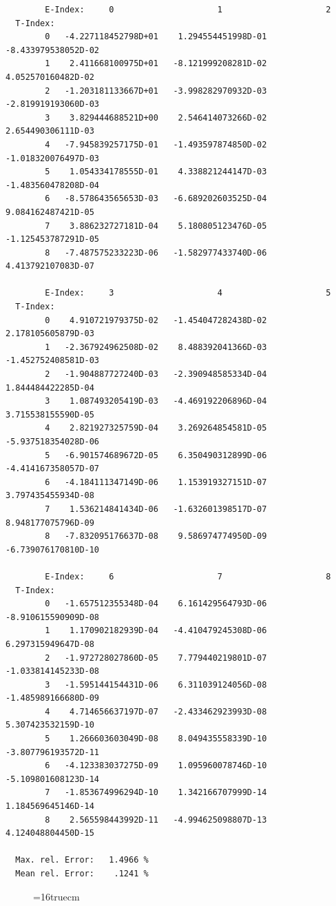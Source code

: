 \documentclass[12pt,dvips]{article}
\begin{document}
\begin{small}\begin{verbatim}
        E-Index:     0                     1                     2
  T-Index:
        0   -4.227118452798D+01    1.294554451998D-01   -8.433979538052D-02
        1    2.411668100975D+01   -8.121999208281D-02    4.052570160482D-02
        2   -1.203181133667D+01   -3.998282970932D-03   -2.819919193060D-03
        3    3.829444688521D+00    2.546414073266D-02    2.654490306111D-03
        4   -7.945839257175D-01   -1.493597874850D-02   -1.018320076497D-03
        5    1.054334178555D-01    4.338821244147D-03   -1.483560478208D-04
        6   -8.578643565653D-03   -6.689202603525D-04    9.084162487421D-05
        7    3.886232727181D-04    5.180805123476D-05   -1.125453787291D-05
        8   -7.487575233223D-06   -1.582977433740D-06    4.413792107083D-07

        E-Index:     3                     4                     5
  T-Index:
        0    4.910721979375D-02   -1.454047282438D-02    2.178105605879D-03
        1   -2.367924962508D-02    8.488392041366D-03   -1.452752408581D-03
        2   -1.904887727240D-03   -2.390948585334D-04    1.844484422285D-04
        3    1.087493205419D-03   -4.469192206896D-04    3.715538155590D-05
        4    2.821927325759D-04    3.269264854581D-05   -5.937518354028D-06
        5   -6.901574689672D-05    6.350490312899D-06   -4.414167358057D-07
        6   -4.184111347149D-06    1.153919327151D-07    3.797435455934D-08
        7    1.536214841434D-06   -1.632601398517D-07    8.948177075796D-09
        8   -7.832095176637D-08    9.586974774950D-09   -6.739076170810D-10

        E-Index:     6                     7                     8
  T-Index:
        0   -1.657512355348D-04    6.161429564793D-06   -8.910615590909D-08
        1    1.170902182939D-04   -4.410479245308D-06    6.297315949647D-08
        2   -1.972728027860D-05    7.779440219801D-07   -1.033814145233D-08
        3   -1.595144154431D-06    6.311039124056D-08   -1.485989166680D-09
        4    4.714656637197D-07   -2.433462923993D-08    5.307423532159D-10
        5    1.266603603049D-08    8.049435558339D-10   -3.807796193572D-11
        6   -4.123383037275D-09    1.095960078746D-10   -5.109801608123D-14
        7   -1.853674996294D-10    1.342166707999D-14    1.184569645146D-14
        8    2.565598443992D-11   -4.994625098807D-13    4.124048804450D-15

  Max. rel. Error:   1.4966 %
  Mean rel. Error:    .1241 %

\end{verbatim}\end{small}
\begin{figure} \label{2.3.9a}
\epsfxsize=16truecm
\end{figure}
\newpage
\end{document}
